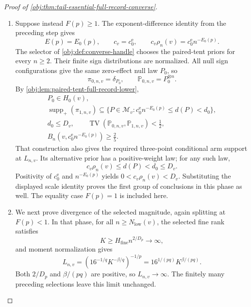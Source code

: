\documentclass[11pt]{article}
\begin{document}
\begin{proof}[Proof of \cref{obj:thm:tail-essential-full-record-converse}]
\begin{enumerate}
Finally, normalization and nonnegative weights ensure that the
alternative prior has a positive-weight law. Choosing such a law \(P\)
gives
\[
c_v\rho_n(v)\le d(P)<d_0\le D_v.
\]
Moreover, \(N_{\mathrm{low}}(v)\ge2\), \(k_v>0\), and
\(c_0^{\mathrm e}>0\), so the defining minimum for \(c_v\) is positive.
Since \(n>0\), also \(\rho_n(v)>0\). Hence
\[
0<c_v\rho_n(v)<D_v,
\]
and every positive-weight alternative law has distance strictly below
\(D_v\). This proves the first group of conclusions in the rough phase.

\item
Suppose instead \(F(p)\ge1\). The exponent-difference identity from the
preceding step gives
\[
E(p)=E_0(p),\qquad
c_v=c_0^{\mathrm e},\qquad
c_v\rho_n(v)=c_0^{\mathrm e}n^{-E_0(p)}.
\]
The selector of \cref{obj:def:converse-handle} chooses the paired-tent
priors for every \(n\ge2\). Their finite sign distributions are
normalized. All null sign configurations give the same zero-effect
null law \(P_0\), so
\[
\pi_{0,n,v}=\delta_{P_0},\qquad
\mathbb P_{0,n,v}=P_0^{\otimes n}.
\]
By \cref{obj:lem:paired-tent-full-record-lower},
\[
\begin{gathered}
P_0\in H_0(v),\\
\operatorname{supp}_+(\pi_{1,n,v})
\subseteq
\{P\in\mathcal M_v:
c_0^{\mathrm e}n^{-E_0(p)}\le d(P)<d_0\},\\
d_0\le D_v,\qquad
\operatorname{TV}(\mathbb P_{0,n,v},\mathbb P_{1,n,v})<\frac12,\\
B_n(v,c_0^{\mathrm e}n^{-E_0(p)})\ge\frac25.
\end{gathered}
\]
That construction also gives the required three-point conditional arm
support at \(L_{n,v}\). Its alternative prior has a positive-weight
law; for any such law,
\[
c_v\rho_n(v)\le d(P)<d_0\le D_v.
\]
Positivity of \(c_0^{\mathrm e}\) and \(n^{-E_0(p)}\) yields
\(0<c_v\rho_n(v)<D_v\). Substituting the displayed scale identity proves
the first group of conclusions in this phase as well. The equality
case \(F(p)=1\) is included here.

\item
We next prove divergence of the selected magnitude, again splitting at
\(F(p)<1\). In that phase, for all
\(n\ge N_{\mathrm{low}}(v)\), the selected fine rank satisfies
\[
K\ge H_{\mathrm{fine}}n^{2/D_p}\longrightarrow\infty,
\]
and moment normalization gives
\[
L_{n,v}
=
\left(16^{-1/q}K^{-\beta/q}\right)^{-1/p}
=
16^{1/(pq)}K^{\beta/(pq)}.
\]
Both \(2/D_p\) and \(\beta/(pq)\) are positive, so
\(L_{n,v}\to\infty\). The finitely many preceding selections leave this
limit unchanged.


\end{enumerate}
\end{proof}
\end{document}
